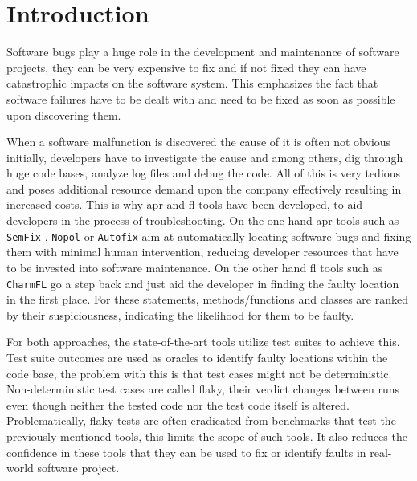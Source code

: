 \documentclass[
fancyheadings, %
%
%
]{stsreprt}
\begin{document}
\chapter{Introduction}
Software bugs play a huge role in the development and maintenance of software projects, they can be very expensive to fix and if not fixed they can have catastrophic impacts on the software system. 
This emphasizes the fact that software failures have to be dealt with and need to be fixed as soon as possible upon discovering them. \par
When a software malfunction is discovered the cause of it is often not obvious initially, developers have to investigate the cause and among others, dig through huge code bases, analyze log files and debug the code. 
All of this is very tedious and poses additional resource demand upon the company effectively resulting in increased costs. 
This is why \acrlong{apr} and \acrlong{fl} tools have been developed, to aid developers in the process of troubleshooting. 
On the one hand \acrshort{apr} tools such as \texttt{SemFix} \cite{semfix:2013}, \texttt{Nopol} \cite{nopol:2017} or \texttt{Autofix} \cite{autofix:2014} aim at automatically locating software bugs and fixing them with minimal human intervention, reducing developer resources that have to be invested into software maintenance.
On the other hand \acrshort{fl} tools such as \texttt{CharmFL} \cite{charmfl:2021} go a step back and just aid the developer in finding the faulty location in the first place. 
For these statements, methods/functions and classes are ranked by their suspiciousness, indicating the likelihood for them to be faulty.  \par
For both approaches, the state-of-the-art tools utilize test suites to achieve this. 
Test suite outcomes are used as oracles to identify faulty locations within the code base, the problem with this is that test cases might not be deterministic.
Non-deterministic test cases are called flaky, their verdict changes between runs even though neither the tested code nor the test code itself is altered. 
Problematically, flaky tests are often eradicated from benchmarks that test the previously mentioned tools, this limits the scope of such tools. 
It also reduces the confidence in these tools that they can be used to fix or identify faults in real-world 
software project. \par
\end{document}
